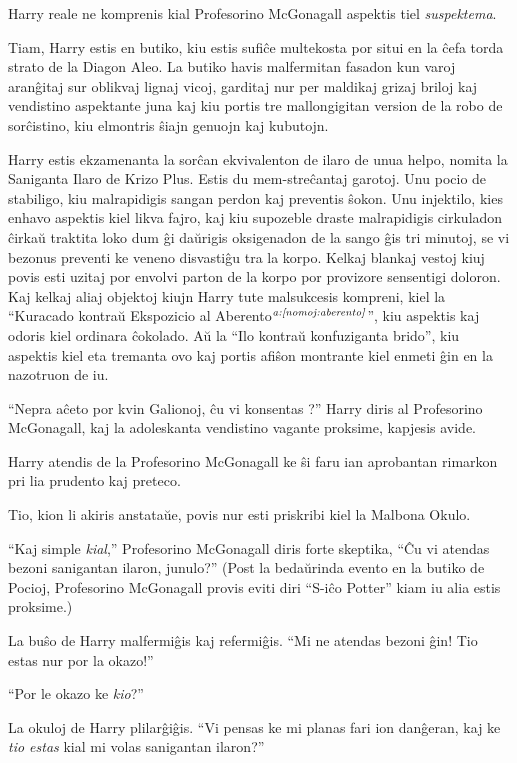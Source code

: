Harry reale ne komprenis kial Profesorino McGonagall aspektis
tiel \emph{suspektema}.

Tiam, Harry estis en butiko, kiu estis sufiĉe multekosta por situi
en la ĉefa torda strato de la Diagon Aleo.  La butiko havis
malfermitan fasadon kun varoj aranĝitaj sur oblikvaj lignaj vicoj,
garditaj nur per maldikaj grizaj briloj kaj vendistino aspektante juna
kaj kiu portis tre mallongigitan version de la robo de sorĉistino,
kiu elmontris ŝiajn genuojn kaj kubutojn.

Harry estis ekzamenanta la sorĉan ekvivalenton de ilaro de unua helpo,
nomita la Saniganta Ilaro de Krizo Plus. Estis du mem-streĉantaj
garotoj. Unu pocio de stabiligo, kiu malrapidigis sangan perdon kaj
preventis ŝokon. Unu injektilo, kies enhavo aspektis kiel likva fajro,
kaj kiu supozeble draste malrapidigis cirkuladon ĉirkaŭ traktita loko
dum ĝi daŭrigis oksigenadon de la sango ĝis tri minutoj, se vi bezonus
preventi ke veneno disvastiĝu tra la korpo. Kelkaj blankaj vestoj kiuj
povis esti uzitaj por envolvi parton de la korpo por provizore
sensentigi doloron.  Kaj kelkaj aliaj objektoj kiujn Harry tute
malsukcesis kompreni, kiel la ``Kuracado kontraŭ Ekspozicio al
Aberento$^{\textit{a:\ref{nomoj:aberento}}}$'', kiu aspektis kaj odoris kiel
ordinara ĉokolado. Aŭ la ``Ilo kontraŭ konfuziganta brido'', kiu
aspektis kiel eta tremanta ovo kaj portis afiŝon montrante kiel enmeti
ĝin en la nazotruon de iu.

``Nepra aĉeto por kvin Galionoj, ĉu vi konsentas ?'' Harry diris al
Profesorino McGonagall, kaj la adoleskanta vendistino vagante
proksime, kapjesis avide.

Harry atendis de la Profesorino McGonagall ke ŝi faru ian aprobantan
rimarkon pri lia prudento kaj preteco.

Tio, kion li akiris anstataŭe, povis nur esti priskribi kiel la Malbona Okulo.

``Kaj simple \emph{kial},'' Profesorino McGonagall diris forte
skeptika, ``Ĉu vi atendas bezoni sanigantan ilaron, junulo?'' (Post
la bedaŭrinda evento en la butiko de Pocioj, Profesorino McGonagall
provis eviti diri ``S-iĉo Potter'' kiam iu alia estis proksime.)

La buŝo de Harry malfermiĝis kaj refermiĝis. ``Mi ne atendas bezoni
ĝin! Tio estas nur por la okazo!''

``Por le okazo ke \emph{kio}?''

La okuloj de Harry plilarĝiĝis. ``Vi pensas ke mi planas fari ion
danĝeran, kaj ke \emph{tio estas} kial mi volas sanigantan ilaron?''

